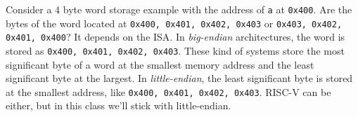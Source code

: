 Consider a 4 byte word storage example with the address
of \texttt{a} at \texttt{0x400}. Are the bytes of the word
located at \texttt{0x400, 0x401, 0x402, 0x403} or
\texttt{0x403, 0x402, 0x401, 0x400}? It depends on the
ISA. In \emph{big-endian} architectures, the word is
stored as \texttt{0x400, 0x401, 0x402, 0x403}. These kind
of systems store the most significant byte of a word at
the smallest memory address and the least significant
byte at the largest. In \emph{little-endian}, the least
significant byte is stored at the smallest address,
like \texttt{0x400, 0x401, 0x402, 0x403}. RISC-V can be
either, but in this class we'll stick with little-endian.